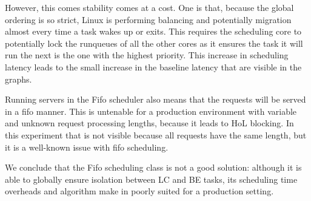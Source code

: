 However, this comes stability comes at a cost. One is that, because the global
ordering is so strict, Linux is performing balancing and potentially migration
almost every time a task wakes up or exits. This requires the scheduling core to
potentially lock the runqueues of all the other cores as it ensures the task it
will run the next is the one with the highest priority. This increase in
scheduling latency leads to the small increase in the baseline latency that are
visible in the graphs.

Running servers in the Fifo scheduler also means that the requests will be
served in a fifo manner. This is untenable for a production environment with
variable and unknown request processing lengths, because it leads to HoL
blocking. In this experiment that is not visible because all requests have the
same length, but it is a well-known issue with fifo scheduling.

We conclude that the Fifo scheduling class is not a good solution: although it
is able to globally ensure isolation between LC and BE tasks, its scheduling
time overheads and algorithm make in poorly suited for a production setting.



